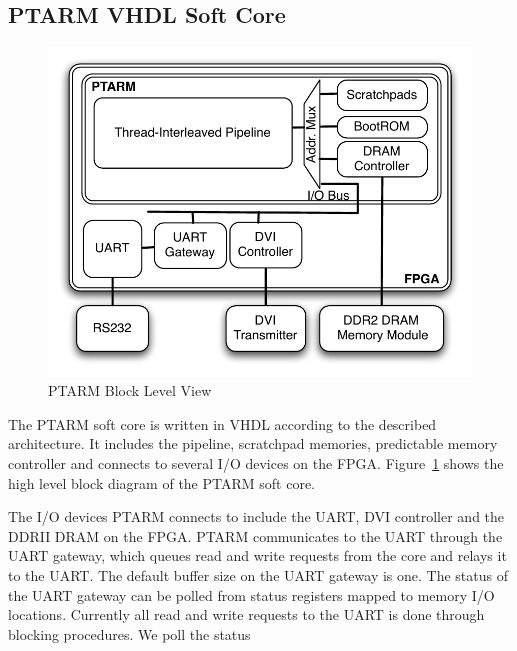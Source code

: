 \subsection{PTARM VHDL Soft Core}
\label{sec:ptarm_vhdl_soft_core}
\begin{figure}
  \vspace{-20pt}
  \begin{center}
    \includegraphics[scale=.6]{figs/ptarm_vhdl_high_level}
  \end{center}
  \vspace{-20pt}
  \caption{PTARM Block Level View}
  \label{fig:ptarm_vhdl_high_level}
  \vspace{-10pt}
\end{figure}   
The PTARM soft core is written in VHDL according to the described architecture.
It includes the pipeline, scratchpad memories, predictable memory controller and connects to several I/O devices on the FPGA.
Figure~\ref{fig:ptarm_vhdl_high_level} shows the high level block diagram of the PTARM soft core.

The I/O devices PTARM connects to include the UART, DVI controller and the DDRII DRAM on the FPGA.
PTARM communicates to the UART through the UART gateway, which queues read and write requests from the core and relays it to the UART.
The default buffer size on the UART gateway is one.
The status of the UART gateway can be polled from status registers mapped to memory I/O locations.
Currently all read and write requests to the UART is done through blocking procedures.
We poll the status 
 
